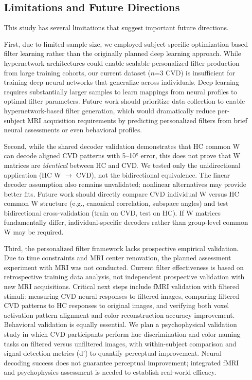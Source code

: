 \documentclass[12pt,a4paper]{article}
\begin{document}
\subsection{Limitations and Future Directions}

This study has several limitations that suggest important future directions.

First, due to limited sample size, we employed subject-specific optimization-based filter learning rather than the originally planned deep learning approach. While hypernetwork architectures could enable scalable personalized filter production from large training cohorts, our current dataset ($n$=3 CVD) is insufficient for training deep neural networks that generalize across individuals. Deep learning requires substantially larger samples to learn mappings from neural profiles to optimal filter parameters. Future work should prioritize data collection to enable hypernetwork-based filter generation, which would dramatically reduce per-subject MRI acquisition requirements by predicting personalized filters from brief neural assessments or even behavioral profiles.

Second, while the shared decoder validation demonstrates that HC common W can decode aligned CVD patterns with 5--10° error, this does not prove that W matrices are \textit{identical} between HC and CVD. We tested only the unidirectional application (HC W $\rightarrow$ CVD), not the bidirectional equivalence. The linear decoder assumption also remains unvalidated; nonlinear alternatives may provide better fits. Future work should directly compare CVD individual W versus HC common W structure (e.g., canonical correlation, subspace angles) and test bidirectional cross-validation (train on CVD, test on HC). If W matrices fundamentally differ, individual-specific decoders rather than group-level common W may be required.

Third, the personalized filter framework lacks prospective empirical validation. Due to time constraints and MRI center renovation, the planned assessment experiment with MRI was not conducted. Current filter effectiveness is based on retrospective training data analysis, not independent prospective validation with new MRI acquisitions. Critical next steps include fMRI validation with filtered stimuli: measuring CVD neural responses to filtered images, comparing filtered CVD patterns to HC responses to original images, and verifying both voxel activation pattern alignment and color reconstruction accuracy improvement. Behavioral validation is equally essential. We plan a psychophysical validation study in which CVD participants perform hue discrimination and color-naming tasks on filtered versus unfiltered images, with within-subject comparison and signal detection metrics (d') to quantify perceptual improvement. Neural decoding success does not guarantee perceptual improvement; integrated fMRI and psychophysics assessment is needed to establish real-world efficacy.
\end{document}
